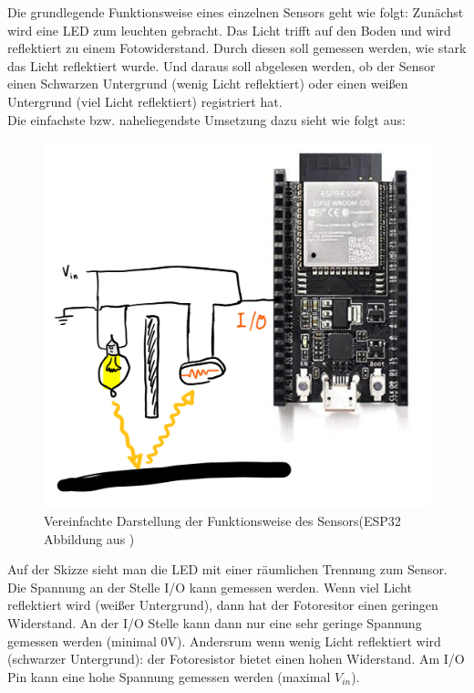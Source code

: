 	Die grundlegende Funktionsweise eines einzelnen Sensors geht wie folgt: Zunächst wird eine LED zum leuchten gebracht. Das Licht trifft auf den Boden und wird reflektiert zu einem Fotowiderstand. Durch diesen soll gemessen werden, wie stark das Licht reflektiert wurde. Und daraus soll abgelesen werden, ob der Sensor einen Schwarzen Untergrund (wenig Licht reflektiert) oder einen weißen Untergrund (viel Licht reflektiert) registriert hat.\\
	
	Die einfachste bzw. naheliegendste Umsetzung dazu sieht wie folgt aus:
	
	\begin{figure}[H]
		\centering
		\label{Sensorfunktion}
		\includegraphics[scale=0.5]{img/Sensor/Sensor4.png}
		\caption{Vereinfachte Darstellung der Funktionsweise des Sensors(ESP32 Abbildung aus 	\cite{ESP32Picture})}
	\end{figure}
	
	Auf der Skizze sieht man die LED mit einer räumlichen Trennung zum Sensor. Die Spannung an der Stelle I/O kann gemessen werden. Wenn viel Licht reflektiert wird (weißer Untergrund), dann hat der Fotoresitor einen geringen Widerstand. An der I/O Stelle kann dann nur eine sehr geringe Spannung gemessen werden (minimal 0V). Andersrum wenn wenig Licht reflektiert wird (schwarzer Untergrund): der Fotoresistor bietet einen hohen Widerstand. Am I/O Pin kann eine hohe Spannung gemessen werden (maximal $V_{in}$).
	
